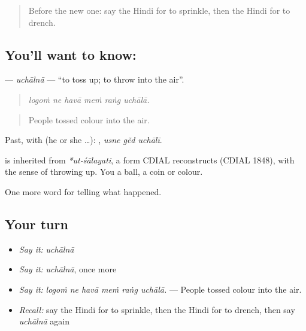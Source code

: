 \label{lesson:HI-C329-uchalna}



\begin{quote}
Before the new one: say the Hindi for to sprinkle, then the Hindi for to drench.
\end{quote}

\subsection*{You'll want to know: }
\textbf{} — \emph{uchālnā} — \textquotedblleft{}to toss up; to throw into the air\textquotedblright{}.

\begin{quote}
     
\end{quote}

\begin{quote}
\emph{logoṁ ne havā meṁ raṅg uchālā.}
\end{quote}

\begin{quote}
People tossed colour into the air.
\end{quote}

Past, with  (he or she …):   , \emph{usne gẽd uchālī}.

\begin{cousinweb}
is inherited from \emph{*ut-śālayati}, a form CDIAL reconstructs (CDIAL 1848), with the sense of throwing up. You \textbf{} a ball, a coin or colour.
\end{cousinweb}

\begin{grammarlens}[title={What you've built}]
One more word for telling what happened.
\end{grammarlens}

\subsection*{Your turn}
\begin{itemize}
\raggedright
  \item \emph{Say it:} \emph{uchālnā}
  \item \emph{Say it:} \emph{uchālnā}, once more
  \item \emph{Say it:} \emph{logoṁ ne havā meṁ raṅg uchālā.} — People tossed colour into the air.
  \item \emph{Recall:} say the Hindi for to sprinkle, then the Hindi for to drench, then say \emph{uchālnā} again
\end{itemize}


